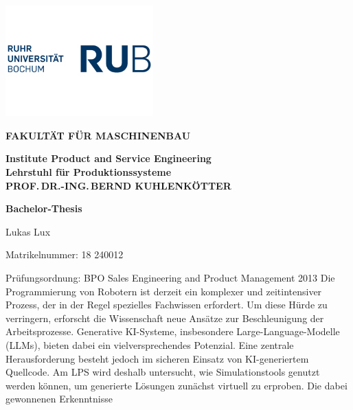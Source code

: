 \begin{titlepage}
  \rubflama %
  \thispagestyle{empty}
  \noindent
  \begin{minipage}{0.5\textwidth}%
    \includegraphics[width=56.9mm]{Figures/RUB-Logo-blau.png}
  \end{minipage}%
  \hfill%
  \begin{minipage}{0.5\textwidth}\raggedleft
    {\fontsize{9}{12}\selectfont \textcolor{rubgreen}{\bfseries FAKULTÄT FÜR
    MASCHINENBAU}}\par
    {\fontsize{8}{12}\selectfont \bfseries
      Institute Product and Service Engineering\\
      Lehrstuhl für Produktionssysteme\\
    PROF.\,DR.-ING.\,BERND KUHLENKÖTTER}%
  \end{minipage}
  \begin{center}
    {\bfseries \fontsize{16}{12}\selectfont Bachelor-Thesis}\par
    {Lukas Lux}
  \end{center}
  \fontsize{10}{12}\selectfont Matrikelnummer:  18 240012\par
  Prüfungsordnung: \quad BPO Sales Engineering and Product
  Management 2013
  \bigbreak
  \fontsize{12}{12}\selectfont{\bfseries Thema: \quad Entwicklung
    eines Frameworks zur simulationsbasierten Validierung
  LLM-generierten Robotercodes in Unity}
  \bigbreak
  \fontsize{10}{12}\selectfont Die Programmierung von Robotern ist derzeit ein
  komplexer und  zeitintensiver Prozess, der in der Regel spezielles Fachwissen
  erfordert. Um diese Hürde zu verringern, erforscht die Wissenschaft
  neue Ansätze zur Beschleunigung der Arbeitsprozesse. Generative
  KI-Systeme, insbesondere Large-Language-Modelle (LLMs), bieten
  dabei ein vielversprechendes Potenzial.
  Eine zentrale Herausforderung besteht jedoch im sicheren Einsatz
  von KI-generiertem Quellcode. Am LPS wird deshalb untersucht, wie
  Simulationstools genutzt werden können, um generierte Lösungen
  zunächst virtuell zu erproben. Die dabei gewonnenen Erkenntnisse

\end{titlepage}

